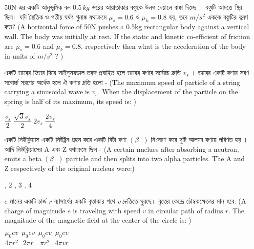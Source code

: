 \documentclass[addpoints]{exam}
\begin{document}
\begin{questions}
\question 50N এর একটি আনুভূমিক বল $ 0.5\,kg $ ভরের আয়াতাকার বস্তুকে উলম্ব দেয়ালে ধাক্বা দিচ্ছে । বস্তুটি আদতে স্থির ছিল। যদি স্থৈতিক ও গতীয় ঘর্ষণ গুনাঙ্ক যথাক্রমে $ \mu_{s} = 0.6 $ ও  $ \mu_{k} = 0.8 $ হয়, তবে $ m/s^{2} $ এককে বস্তুটির ত্বরণ কত? (A horizontal force of 50N pushes a 0.5kg rectangular body against a vertical wall. The body was initially at rest. If the static and kinetic co-efficient of friction are $ \mu_{s} = 0.6 $ and $ \mu_{k} = 0.8 $, respectively then what is the acceleration of the body in units of $ m/s^{2} $ ? )

\begin{oneparchoices}
\end{oneparchoices}

\question  একটি তারের ভিতর দিয়ে সাইনুসয়ডাল তরঙ্গ প্রবাহিত হলে তারের কণার সর্বোচ্চ দ্রুতি $ v_{s} $ । তারের একটি কণার সরণ সবোর্চ্চ সরণের অর্ধেক হলে ঐ কণার দ্রতি হলো - (The maximum speed of particle of a string carrying a sinusoidal wave is $ v_{s} $. When the displacement of the particle on the spring is half of its maximum, its speed is: )

\begin{oneparchoices}
\choice $ \dfrac{v_{s}}{2} $
\choice $ \dfrac{\sqrt{3}v_{s}}{2} $
\choice $ 2v_{s} $
\choice $ \dfrac{2v_{s}}{4} $
\end{oneparchoices}

\question  একটি নিউক্লিয়াস একটি নিউট্রন গ্রহন করে একটি বিটা কণা $ (\beta^{-})  $ নি:সরণ করে  দুটি আলফা কণায় পরিণত হয় । আদি নিউক্লিয়াসের A এবং Z যথাক্রমে ছিল - (A certain nuclues after absorbing a neutron, emits a beta $ (\beta^{-})  $ particle and then splits into two alpha particles. The A and Z respectively of the original nucleus were:)

\begin{oneparchoices}
, 2
, 3
, 4
\end{oneparchoices}

\question  $ e $ মানের একটি চার্জ $ r $ ব্যাসার্ধের একটি বৃত্তাকার পথে $ v $ দ্রুতিতে ঘুরছে। বৃত্তের কেন্দ্রে চৌম্বকক্ষেত্রের মান হবে:  (A charge of magnitude $ e $ is traveling with speed $ v $ in circular path of radius $ r $. The magnitude of the magnetic field at the center of the circle is: )

\begin{oneparchoices}
\choice  $\dfrac{\mu_{0}ev}{4\pi r^{2}}$
\choice  $\dfrac{\mu_{0}ev}{2\pi r}$
\choice  $\dfrac{\mu_{0}ev}{\pi r^{2}}$
\choice  $\dfrac{\mu_{0}ev}{4\pi v r}$
\end{oneparchoices}


\end{questions}
\end{document}
